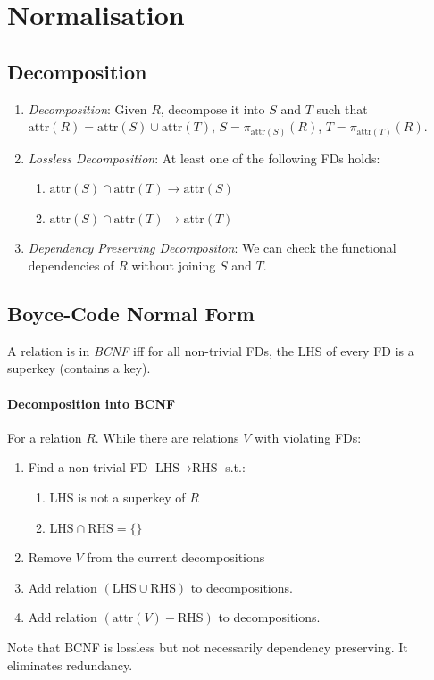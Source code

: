 \documentclass[twocolumn,english]{article}
\begin{document}
\section{Normalisation}


\subsection{Decomposition}
\begin{enumerate}
\item \emph{Decomposition}: Given $R$, decompose it into $S$ and $T$
such that $\mbox{attr}\left(R\right)=\mbox{attr}\left(S\right)\cup\mbox{attr}\left(T\right)$,
$S=\pi_{\mbox{attr}\left(S\right)}\left(R\right)$, $T=\pi_{\mbox{attr}\left(T\right)}\left(R\right)$.
\item \emph{Lossless Decomposition}: At least one of the following FDs holds:

\begin{enumerate}
\item $\mbox{attr}\left(S\right)\cap\mbox{attr}\left(T\right)\rightarrow\mbox{attr}\left(S\right)$
\item $\mbox{attr}\left(S\right)\cap\mbox{attr}\left(T\right)\rightarrow\mbox{attr}\left(T\right)$
\end{enumerate}
\item \emph{Dependency Preserving Decompositon}: We can check the functional
dependencies of $R$ without joining $S$ and $T$.
\end{enumerate}

\subsection{Boyce-Code Normal Form}

A relation is in \emph{BCNF} iff for all non-trivial FDs, the LHS
of every FD is a superkey (contains a key).


\paragraph{Decomposition into BCNF}

For a relation $R$. While there are relations $V$ with violating
FDs:
\begin{enumerate}
\item Find a non-trivial FD $\mbox{LHS}\rightarrow\mbox{RHS}$ s.t.:

\begin{enumerate}
\item LHS is not a superkey of $R$
\item $\mbox{LHS}\cap\mbox{RHS}=\{\}$
\end{enumerate}
\item Remove $V$ from the current decompositions
\item Add relation $\left(\mbox{LHS}\cup\mbox{RHS}\right)$ to decompositions.
\item Add relation $\left(\mbox{attr}\left(V\right)-\mbox{RHS}\right)$
to decompositions.
\end{enumerate}
Note that BCNF is lossless but not necessarily dependency preserving.
It eliminates redundancy.
\end{document}

